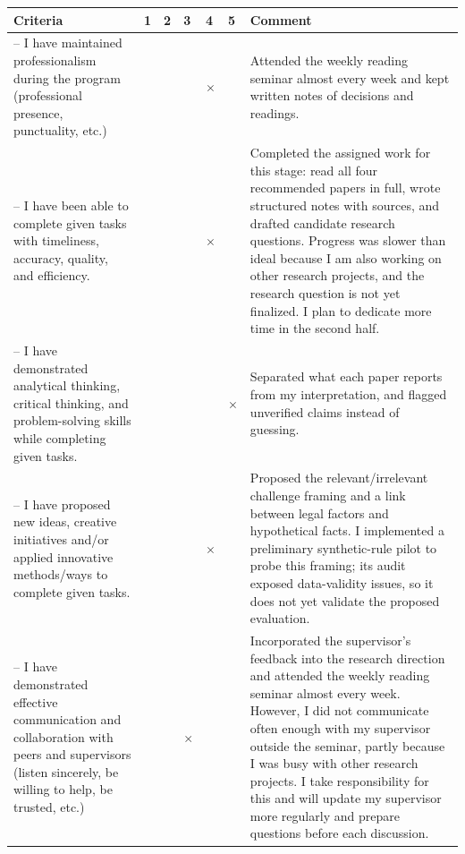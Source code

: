 \documentclass[11pt,a4paper]{article}
\newcommand{\X}{$\times$}
\begin{document}
\small
\renewcommand{\arraystretch}{1.3}
\begin{tabularx}{\textwidth}{|>{\raggedright\arraybackslash}p{4.6cm}|*{5}{>{\centering\arraybackslash}p{0.55cm}|}X|}
\hline
\textbf{Criteria} & \textbf{1} & \textbf{2} & \textbf{3} & \textbf{4} & \textbf{5} & \textbf{Comment} \\ \hline
1 -- I have maintained professionalism during the program (professional presence, punctuality, etc.) & & & & \X & & Attended the weekly reading seminar almost every week and kept written notes of decisions and readings. \\ \hline
2 -- I have been able to complete given tasks with timeliness, accuracy, quality, and efficiency. & & & & \X & & Completed the assigned work for this stage: read all four recommended papers in full, wrote structured notes with sources, and drafted candidate research questions. Progress was slower than ideal because I am also working on other research projects, and the research question is not yet finalized. I plan to dedicate more time in the second half. \\ \hline
3 -- I have demonstrated analytical thinking, critical thinking, and problem-solving skills while completing given tasks. & & & & & \X & Separated what each paper reports from my interpretation, and flagged unverified claims instead of guessing. \\ \hline
4 -- I have proposed new ideas, creative initiatives and/or applied innovative methods/ways to complete given tasks. & & & & \X & & Proposed the relevant/irrelevant challenge framing and a link between legal factors and hypothetical facts. I implemented a preliminary synthetic-rule pilot to probe this framing; its audit exposed data-validity issues, so it does not yet validate the proposed evaluation. \\ \hline
5 -- I have demonstrated effective communication and collaboration with peers and supervisors (listen sincerely, be willing to help, be trusted, etc.) & & & \X & & & Incorporated the supervisor's feedback into the research direction and attended the weekly reading seminar almost every week. However, I did not communicate often enough with my supervisor outside the seminar, partly because I was busy with other research projects. I take responsibility for this and will update my supervisor more regularly and prepare questions before each discussion. \\ \hline
\end{tabularx}
\normalsize
\end{document}
